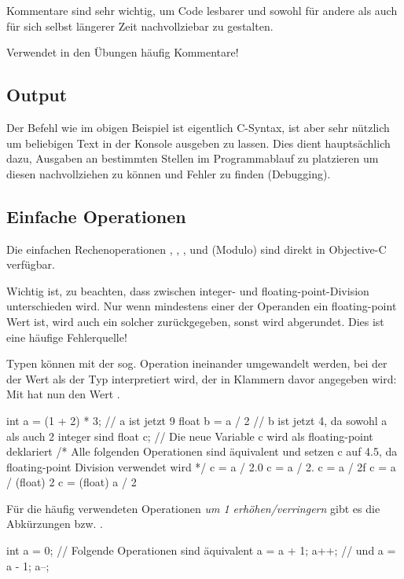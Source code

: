 \documentclass[parskip=half, final]{scrreprt}
\begin{document}
Kommentare sind sehr wichtig, um Code lesbarer und sowohl für andere als auch für sich selbst längerer Zeit nachvollziebar zu gestalten.

Verwendet in den Übungen häufig Kommentare!

\subsection{Output}

Der Befehl  wie im obigen Beispiel ist eigentlich C-Syntax, ist aber sehr nützlich um beliebigen Text in der Konsole ausgeben zu lassen. Dies dient hauptsächlich dazu, Ausgaben an bestimmten Stellen im Programmablauf zu platzieren um diesen nachvollziehen zu können und Fehler zu finden (Debugging).

\subsection{Einfache Operationen}

Die einfachen Rechenoperationen \objc{+}, \objc{-}, \objc{*}, \objc{/} und \objc{\%} (Modulo) sind direkt in Objective-C verfügbar.

Wichtig ist, zu beachten, dass zwischen integer- und floating-point-Division unterschieden wird. Nur wenn mindestens einer der Operanden ein floating-point Wert ist, wird auch ein solcher zurückgegeben, sonst wird abgerundet. Dies ist eine häufige Fehlerquelle!

Typen können mit der sog.  Operation ineinander umgewandelt werden, bei der der Wert als der Typ interpretiert wird, der in Klammern davor angegeben wird:\\
Mit  hat  nun den Wert .

\begin{objclst}
int a = (1 + 2) * 3; // a ist jetzt 9
float b = a / 2 // b ist jetzt 4, da sowohl a als auch 2 integer sind
float c; // Die neue Variable c wird als floating-point deklariert
/* Alle folgenden Operationen sind äquivalent und
setzen c auf 4.5, da floating-point Division verwendet wird */
c = a / 2.0
c = a / 2.
c = a / 2f
c = a / (float) 2
c = (float) a / 2
\end{objclst}

Für die häufig verwendeten Operationen \emph{um 1 erhöhen/verringern} gibt es die Abkürzungen  bzw. .
\begin{objclst}
int a = 0;
// Folgende Operationen sind äquivalent
a = a + 1;
a++;
// und
a = a - 1;
a--;
\end{objclst}
\end{document}

